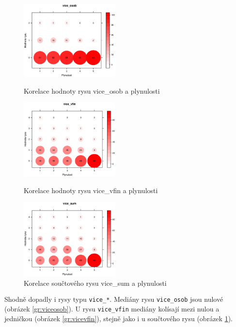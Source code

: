 \documentclass[12pt,a4paper]{report}
\begin{document}
\begin{figure}[!htb]
  \centering\includegraphics[width=50mm]{./grafy/rysy/vice_osob-c.eps}
  \caption{Korelace hodnoty rysu vice\_osob a plynulosti}\label{gr:viceosob}
\endminipage\hfill
{}
  \centering\includegraphics[width=50mm]{./grafy/rysy/vice_vfin-c.eps}
  \caption{Korelace hodnoty rysu vice\_vfin a plynulosti}\label{gr:vicevfin}
\endminipage\hfill
{}
  \centering\includegraphics[width=50mm]{./grafy/rysy/vice_sum-c.eps}
  \caption{Korelace součtového rysu vice\_sum a plynulosti}\label{gr:vicesum}
\endminipage\hfill
\end{figure}

Shodně dopadly i rysy typu \texttt{vice\_*}. Mediány rysu \texttt{vice\_osob} jsou nulové (obrázek \ref{gr:viceosob}). U rysu \texttt{vice\_vfin} mediány kolísají mezi nulou a jedničkou (obrázek \ref{gr:vicevfin}), stejně jako i u součtového rysu (obrázek \ref{gr:vicesum}).
\end{document}
